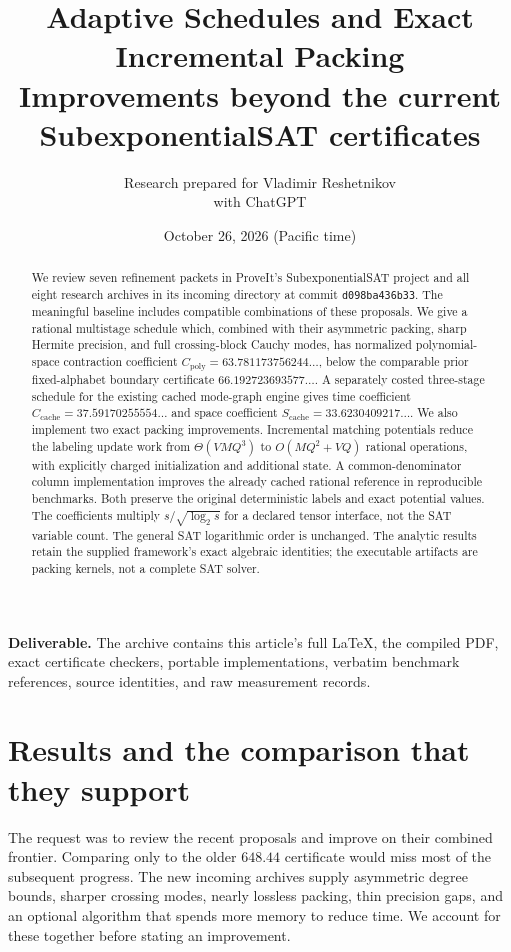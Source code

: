\documentclass[11pt,letterpaper]{article}
\title{\textbf{Adaptive Schedules and Exact Incremental Packing}\\[5pt]
\large Improvements beyond the current SubexponentialSAT certificates}
\author{Research prepared for Vladimir Reshetnikov\\with ChatGPT}
\date{October 26, 2026 (Pacific time)}
\theoremstyle{remark}\newtheorem{remark}[theorem]{Remark}
\newcommand{\Cnew}{C_{\mathrm{poly}}}
\newcommand{\Ccache}{C_{\mathrm{cache}}}
\newcommand{\Scache}{S_{\mathrm{cache}}}
\begin{document}
\maketitle
\begin{abstract}
We review seven refinement packets in ProveIt's SubexponentialSAT project and
all eight research archives in its incoming directory at commit
\texttt{d098ba436b33}. The meaningful baseline includes compatible combinations
of these proposals. We give a rational multistage schedule which, combined
with their asymmetric packing, sharp Hermite precision, and full crossing-block
Cauchy modes, has normalized polynomial-space contraction coefficient
$\Cnew=63.781173756244\ldots$, below the comparable prior fixed-alphabet
boundary certificate $66.192723693577\ldots$.
A separately costed three-stage schedule for the existing cached mode-graph
engine gives time coefficient $\Ccache=37.59170255554\ldots$ and space
coefficient $\Scache=33.6230409217\ldots$.
We also implement two exact packing improvements. Incremental matching
potentials reduce the labeling update work from $\Theta(VMQ^3)$ to
$O(MQ^2+VQ)$ rational operations, with explicitly charged initialization and
additional state. A common-denominator column implementation improves the
already cached rational reference in reproducible benchmarks. Both preserve
the original deterministic labels and exact potential values.
The coefficients multiply $s/\sqrt{\log_2 s}$ for a declared tensor interface,
not the SAT variable count. The general SAT logarithmic order is unchanged.
The analytic results retain the supplied framework's exact algebraic identities;
the executable artifacts are packing kernels, not a complete SAT solver.
\end{abstract}
\noindent\textbf{Deliverable.} The archive contains this article's full \LaTeX,
the compiled PDF, exact certificate checkers, portable implementations,
verbatim benchmark references, source identities, and raw measurement records.
\clearpage
\tableofcontents
\clearpage

\section{Results and the comparison that they support}
\label{sec:results}
The request was to review the recent proposals and improve on their combined
frontier. Comparing only to the older $648.44$ certificate would miss most of
the subsequent progress. The new incoming archives supply asymmetric degree
bounds, sharper crossing modes, nearly lossless packing, thin precision gaps,
and an optional algorithm that spends more memory to reduce time. We account
for these together before stating an improvement.
\end{document}
